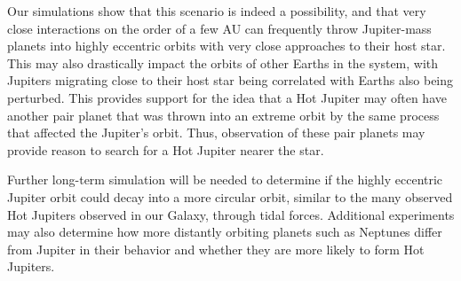 \documentclass[12pt]{article}
\begin{document}
Our simulations show that this scenario is indeed a possibility, and that very close
interactions on the order of a few AU can frequently throw Jupiter-mass planets into
highly eccentric orbits with very close approaches to their host star. 
This may also drastically impact the orbits of other Earths 
in the system, with Jupiters migrating close to their host star being correlated
with Earths also being perturbed. This provides support for the idea that a Hot Jupiter may 
often have another pair planet that was thrown into an extreme orbit by the same
process that affected the Jupiter's orbit. Thus,
observation of these pair planets may provide reason to search for a Hot Jupiter
nearer the star.

Further long-term simulation will be needed to determine if the highly eccentric Jupiter
orbit could decay into a more circular orbit, similar to the many observed 
Hot Jupiters observed in our Galaxy, through tidal forces. Additional experiments may
also determine how more distantly orbiting planets such as Neptunes differ from Jupiter
in their behavior and whether they are more likely to form Hot Jupiters.

\clearpage
\end{document}
